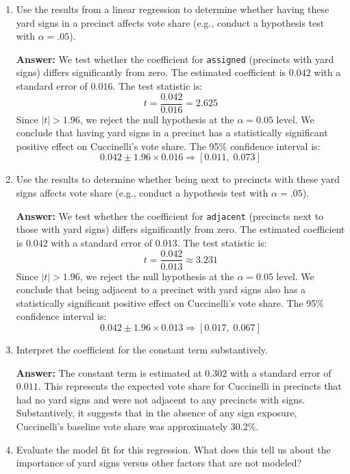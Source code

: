 \documentclass[12pt,letterpaper]{article}
\begin{document}
\vspace{.5cm}
\begin{enumerate}
	\item [(a)] Use the results from a linear regression to determine whether having these yard signs in a precinct affects vote share (e.g., conduct a hypothesis test with $\alpha = .05$).
	
	\textbf{Answer:}  
	We test whether the coefficient for \texttt{assigned} (precincts with yard signs) differs significantly from zero. The estimated coefficient is $0.042$ with a standard error of $0.016$. The test statistic is:
	\[
	t = \frac{0.042}{0.016} = 2.625
	\]
	Since $|t| > 1.96$, we reject the null hypothesis at the $\alpha = 0.05$ level. We conclude that having yard signs in a precinct has a statistically significant positive effect on Cuccinelli’s vote share. The 95\% confidence interval is:
	\[
	0.042 \pm 1.96 \times 0.016 \Rightarrow [0.011,\; 0.073]
	\]
	\newpage
	
	\item [(b)]  Use the results to determine whether being next to precincts with these yard signs affects vote share (e.g., conduct a hypothesis test with $\alpha = .05$).
	
	\textbf{Answer:}  
	We test whether the coefficient for \texttt{adjacent} (precincts next to those with yard signs) differs significantly from zero. The estimated coefficient is $0.042$ with a standard error of $0.013$. The test statistic is:
	\[
	t = \frac{0.042}{0.013} \approx 3.231
	\]
	Since $|t| > 1.96$, we reject the null hypothesis at the $\alpha = 0.05$ level. We conclude that being adjacent to a precinct with yard signs also has a statistically significant positive effect on Cuccinelli’s vote share. The 95\% confidence interval is:
	\[
	0.042 \pm 1.96 \times 0.013 \Rightarrow [0.017,\; 0.067]
	\]
	
	\item [(c)] Interpret the coefficient for the constant term substantively.
	
	\textbf{Answer:}  
	The constant term is estimated at $0.302$ with a standard error of $0.011$. This represents the expected vote share for Cuccinelli in precincts that had no yard signs and were not adjacent to any precincts with signs. Substantively, it suggests that in the absence of any sign exposure, Cuccinelli’s baseline vote share was approximately 30.2\%.
	
	\item [(d)] Evaluate the model fit for this regression.  What does this	tell us about the importance of yard signs versus other factors that are not modeled?
	

\end{enumerate}
\end{document}
